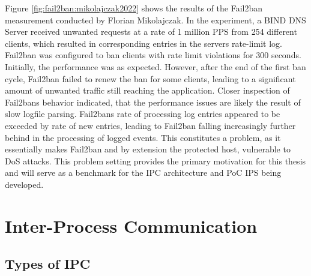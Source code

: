 Figure \ref{fig:fail2ban:mikolajczak2022} shows the results of the Fail2ban measurement conducted by Florian Mikolajczak. In the experiment, a BIND DNS Server received unwanted requests at a rate of 1 million \ac{PPS} from 254 different clients,
which resulted in corresponding entries in the servers rate-limit log. Fail2ban was configured to ban clients with rate limit violations for 300 seconds. Initially, the performance was as expected. However, after 
the end of the first ban cycle, Fail2ban failed to renew the ban for some clients, leading to a significant amount of unwanted traffic still reaching the application. Closer inspection of Fail2bans behavior indicated,
that the performance issues are likely the result of slow logfile parsing. Fail2bans rate of processing log entries appeared to be exceeded by rate of new entries, leading to Fail2ban falling increasingly further behind
in the processing of logged events. This constitutes a problem, as it essentially makes Fail2ban and by extension the protected host, vulnerable to \ac{DoS} attacks. This problem setting provides the primary motivation for this
thesis and will serve as a benchmark for the \ac{IPC} architecture and \ac{PoC} \ac{IPS} being developed. 

\section{Inter-Process Communication}
\label{sec:ipc}

\subsection{Types of IPC}
\label{sec:ipc_types}

